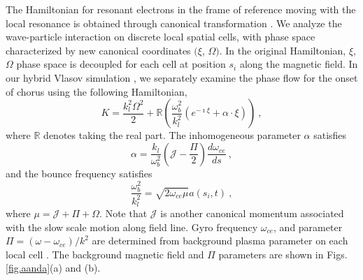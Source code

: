 The Hamiltonian for resonant electrons in the frame of reference moving with the local resonance is obtained through canonical transformation \cite{zheng2024}. We analyze the wave-particle interaction on discrete local spatial cells, with phase space characterized by new canonical coordinates $(\xi$, $\Omega)$. In the original Hamiltonian, $\xi$, $\Omega$ phase space is decoupled for each cell at position $s_i$ along the magnetic field. In our hybrid Vlasov simulation \cite{zheng2023b,zheng2024}, we separately examine the phase flow for the onset of chorus using the following Hamiltonian,
\begin{equation}\label{eq.H_lab}
    K = \frac{k_l^2\Omega^2}{2} + \mathbb{R}\left(\frac{\omega_b^2}{k_l^2} (e^{-\imath \xi} + \alpha \cdot \xi) \right)~,
\end{equation}
where $\mathbb{R}$ denotes taking the real part.
The inhomogeneous parameter $\alpha$ satisfies
\begin{equation}\label{eq.alpold}
   \alpha  = \frac{k_l}{\omega_b^2}(\mathcal{J} - \frac{\Pi}{2}) \frac{d\omega_{ce}}{ds}~,
\end{equation}
and the bounce frequency satisfies
\begin{equation}
    \frac{\omega_b^2}{k_l^2} = \sqrt{2\omega_{ce}\mu}a(s_i,t)~,
\end{equation}
where $\mu = \mathcal{J}+\Pi+\Omega$. 
Note that $\mathcal{J}$ is another canonical momentum associated with the slow scale motion along field line. Gyro frequency $\omega_{ce}$, and parameter $\Pi = (\omega - \omega_{ce})/k^2$ are determined from background plasma parameter on each local cell \cite{zheng2024,zheng2023b}. The background magnetic field and $\Pi$ parameters are shown in Figs. \ref{fig.aanda}(a) and (b).



